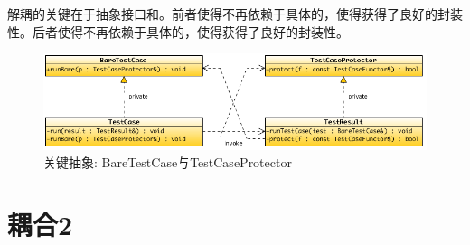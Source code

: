 \begin{content}
解耦的关键在于抽象接口和。前者使得不再依赖于具体的，使得获得了良好的封装性。后者使得不再依赖于具体的，使得获得了良好的封装性。

\begin{figure}[H]
\centering
\includegraphics[width=1.0\textwidth]{figures/xunit/bare-test-case-uml.png}
\caption{关键抽象: BareTestCase与TestCaseProtector}
 \label{fig:bare-test-case-uml}
\end{figure}

\end{content}

\section{耦合2}

